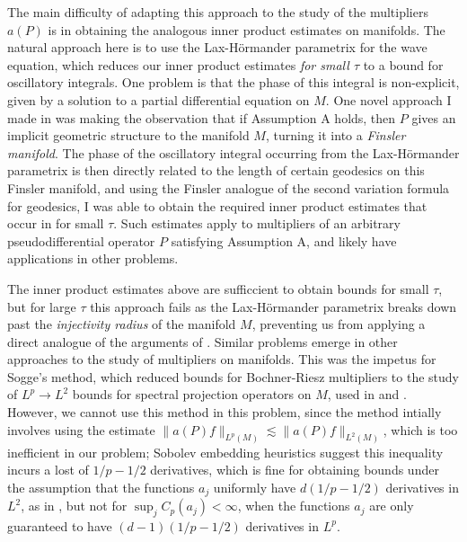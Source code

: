 \documentclass[11pt]{article}
\begin{document}
\noindent The main difficulty of adapting this approach to the study of the multipliers $a(P)$ is in obtaining the analogous inner product estimates on manifolds. The natural approach here is to use the Lax-H\"{o}rmander parametrix for the wave equation, which reduces our inner product estimates \emph{for small $\tau$} to a bound for oscillatory integrals. One problem is that the phase of this integral is non-explicit, given by a solution to a partial differential equation on $M$. One novel approach I made in \cite{DensonCharacterization} was making the observation that if Assumption A holds, then $P$ gives an implicit geometric structure to the manifold $M$, turning it into a \emph{Finsler manifold}. %
The phase of the oscillatory integral occurring from the Lax-H\"{o}rmander parametrix is then directly related to the length of certain geodesics on this Finsler manifold, and using the Finsler analogue of the second variation formula for geodesics, I was able to obtain the required inner product estimates that occur in \cite{HeoNazarovSeeger} for small $\tau$. Such estimates apply to multipliers of an arbitrary pseudodifferential operator $P$ satisfying Assumption A, and likely have applications in other problems.

The inner product estimates above are sufficcient to obtain bounds for small $\tau$, but for large $\tau$ this approach fails as the Lax-H\"{o}rmander parametrix breaks down past the \emph{injectivity radius} of the manifold $M$, preventing us from applying a direct analogue of the arguments of \cite{HeoNazarovSeeger}. Similar problems emerge in other approaches to the study of multipliers on manifolds. This was the impetus for Sogge's method, which reduced bounds for Bochner-Riesz multipliers to the study of $L^p \to L^2$ bounds for spectral projection operators on $M$, used in \cite{SoggeRieszMeans} and \cite{KimManifold}. %
However, we cannot use this method in this problem, since the method intially involves using the estimate $\| a(P) f \|_{L^p(M)} \lesssim \| a(P) f \|_{L^2(M)}$, which is too inefficient in our problem; Sobolev embedding heuristics suggest this inequality incurs a lost of $1/p - 1/2$ derivatives, which is fine for obtaining bounds under the assumption that the functions $a_j$ uniformly have $d(1/p - 1/2)$ derivatives in $L^2$, as in \cite{KimManifold}, but not for $\sup_j C_p(a_j) < \infty$, when the functions $a_j$ are only guaranteed to have $(d-1)(1/p - 1/2)$ derivatives in $L^p$.
\end{document}
